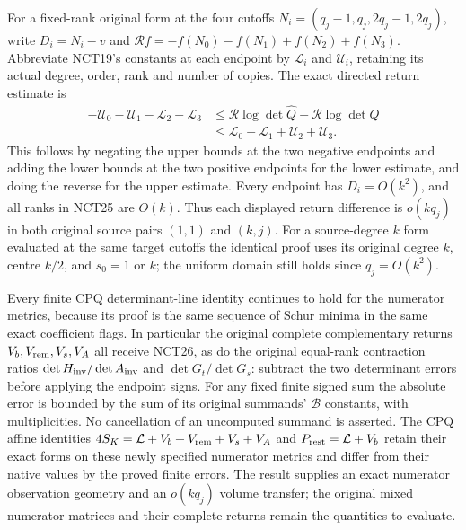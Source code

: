 \documentclass[11pt,a4paper]{article}
\begin{document}
For a fixed-rank original form at the four cutoffs
\(N_i=(q_j-1,q_j,2q_j-1,2q_j)\), write
\(D_i=N_i-v\) and
\(\mathcal Rf=-f(N_0)-f(N_1)+f(N_2)+f(N_3)\).
Abbreviate NCT19's constants at each endpoint by \(\mathcal L_i\)
and \(\mathcal U_i\), retaining its actual degree, order, rank
and number of copies.  The exact directed return estimate is
\[
\begin{split}
 -\mathcal U_0-\mathcal U_1-\mathcal L_2-\mathcal L_3
 &\le\mathcal R\log\det\widehat Q-\mathcal R\log\det Q\\
 &\le\mathcal L_0+\mathcal L_1+\mathcal U_2+\mathcal U_3.
\end{split}\tag{NCT26}
\]
This follows by negating the upper bounds at the two negative
endpoints and adding the lower bounds at the two positive endpoints
for the lower estimate, and doing the reverse for the upper estimate.
Every endpoint has \(D_i=O(k^2)\), and all ranks in NCT25 are
\(O(k)\).  Thus each displayed return difference is \(o(kq_j)\)
in both original source pairs \((1,1)\) and \((k,j)\).
For a source-degree \(k\) form evaluated at the same target
cutoffs the identical proof uses its original degree \(k\),
centre \(k/2\), and \(s_0=1\) or \(k\); the uniform domain
still holds since \(q_j=O(k^2)\).

Every finite CPQ determinant-line identity continues to hold for
the numerator metrics, because its proof is the same sequence
of Schur minima in the same exact coefficient flags.  In particular
the original complete complementary returns \(V_b,V_{\rm rem},V_s,V_A\)
all receive NCT26, as do the original equal-rank contraction ratios
\(\det H_{\rm inv}/\det A_{\rm inv}\) and
\(\det G_t/\det G_s\): subtract the two determinant errors before
applying the endpoint signs.  For any fixed finite signed sum the
absolute error is bounded by the sum of its original summands'
\(\mathcal B\) constants, with multiplicities.  No cancellation
of an uncomputed summand is asserted.  The CPQ affine identities
\(4S_K=\mathcal L+V_b+V_{\rm rem}+V_s+V_A\) and
\(P_{\rm rest}=\mathcal L+V_b\) retain their exact forms on these
newly specified numerator metrics and differ from their native
values by the proved finite errors.  The result supplies an exact
numerator observation geometry and an \(o(kq_j)\) volume transfer;
the original mixed numerator matrices and their complete returns
remain the quantities to evaluate.

\endgroup

\label{MPBUILD:NATIVE_CONDUCTOR_SUBQUOTIENT_TRANSFER:end}
\label{MTBUILD:NCT_COMPLETE_PREREQUISITE:end}
\end{document}
